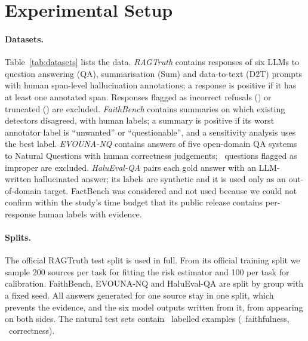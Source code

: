 \section{Experimental Setup}
\label{sec:setup}

\paragraph{Datasets.}
Table~\ref{tab:datasets} lists the data. \emph{RAGTruth} \citep{niu2024ragtruth} contains responses of six LLMs to question answering (QA), summarisation (Sum) and data-to-text (D2T) prompts with human span-level hallucination annotations; a response is positive if it has at least one annotated span. Responses flagged as incorrect refusals (\NExclRefusal) or truncated (\NExclTrunc) are excluded. \emph{FaithBench} \citep{bao2025faithbench} contains summaries on which existing detectors disagreed, with human labels; a summary is positive if its worst annotator label is ``unwanted'' or ``questionable'', and a sensitivity analysis uses the best label. \emph{EVOUNA-NQ} \citep{wang2023evaluating} contains answers of five open-domain QA systems to Natural Questions with human correctness judgements; \NExclImproper\ questions flagged as improper are excluded. \emph{HaluEval-QA} \citep{li2023halueval} pairs each gold answer with an LLM-written hallucinated answer; its labels are synthetic and it is used only as an out-of-domain target. FactBench \citep{bayat2025factbench} was considered and not used because we could not confirm within the study's time budget that its public release contains per-response human labels with evidence.

\begin{table}[t]
\centering\small
\setlength{\tabcolsep}{3pt}
\resizebox{\columnwidth}{!}{}
\caption{Examples per split after exclusions. ``Groups'' are source documents (RAGTruth, FaithBench), questions (EVOUNA) or items (HaluEval); a group never crosses splits. The first five domains measure evidence-grounded faithfulness; EVOUNA-NQ measures reference-based correctness.}
\label{tab:datasets}
\end{table}

\paragraph{Splits.}
The official RAGTruth test split is used in full. From its official training split we sample 200 sources per task for fitting the risk estimator and 100 per task for calibration. FaithBench, EVOUNA-NQ and HaluEval-QA are split by group with a fixed seed. All answers generated for one source stay in one split, which prevents the evidence, and the six model outputs written from it, from appearing on both sides. The natural test sets contain \NTestNatural\ labelled examples (\NTestFaith\ faithfulness, \NTestEvouna\ correctness).

